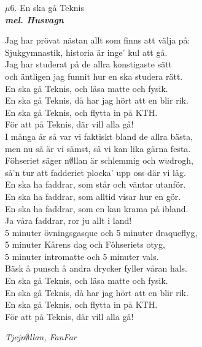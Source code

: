 \documentclass[a6paper,10pt]{article}
\newcommand{\mel}[1]{\small\textbf{\textit{mel. #1 \\}}}
\begin{document}
\setlength{\oddsidemargin}{-0.47in}
\noindent
\begin{center}
\Large $\mu$6. En ska gå Teknis\\
\mel{Husvagn}
\end{center}
Jag har prövat nästan allt som finns att välja på:\\
Sjukgymnastik, historia är inge' kul att gå.\\
Jag har studerat på de allra konstigaste sätt\\
och äntligen jag funnit hur en ska studera rätt.
\vspace{5pt}\\
En ska gå Teknis, och läsa matte och fysik.\\
En ska gå Teknis, då har jag hört att en blir rik.\\
En ska gå Teknis, och flytta in på KTH.\\
För att på Teknis, där vill alla gå!
\vspace{5pt}\\
I många år så var vi faktiskt bland de allra bästa,\\
men nu så är vi sämst, så vi kan lika gärna festa.\\
Föhseriet säger n$\emptyset$llan är schlemmig och w$\ddot{u}$drogh,\\
så'n tur att fadderiet plocka' upp oss där vi låg.
\vspace{5pt}\\
En ska ha faddrar, som står och väntar utanför.\\
En ska ha faddrar, som alltid visar hur en gör.\\
En ska ha faddrar, som en kan krama på ibland.\\
Ja våra faddrar, ror ju allt i land!
\vspace{5pt}\\
5 minuter övningsgasque och 5 minuter draqueflyg,\\
5 minuter Kårens dag och Föhseriets otyg,\\
5 minuter intromatte och 5 minuter vals.\\
Bäsk å punsch å andra drycker fyller våran hals.
\vspace{5pt}\\
En ska gå Teknis, och läsa matte och fysik.\\
En ska gå Teknis, då har jag hört att en blir rik.\\
En ska gå Teknis, och flytta in på KTH.\\
För att på Teknis, där vill alla gå!
\begin{flushright}
\textit{Tjejn$\emptyset$llan, FanFar}
\end{flushright}
\end{document}
